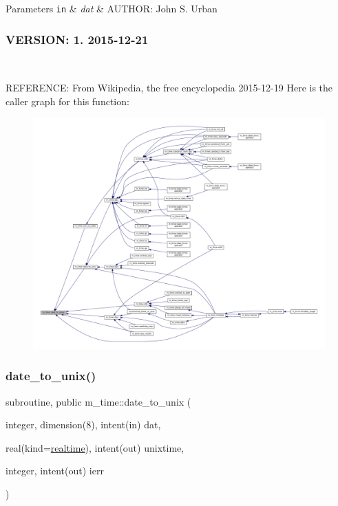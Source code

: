 \begin{DoxyParams}[1]{Parameters}
\mbox{\tt in}  & {\em dat} & A\+U\+T\+H\+OR\+: John S. Urban \subsubsection*{V\+E\+R\+S\+I\+ON\+: 1. 2015-\/12-\/21}\\
\hline
\end{DoxyParams}
R\+E\+F\+E\+R\+E\+N\+CE\+: From Wikipedia, the free encyclopedia 2015-\/12-\/19 Here is the caller graph for this function\+:\nopagebreak
\begin{figure}[H]
\begin{center}
\leavevmode
\includegraphics[width=350pt]{namespacem__time_acfdc970b4154b0c15bd33727636e3992_icgraph}
\end{center}
\end{figure}
\mbox{\label{namespacem__time_aed245c691853279ebf0ce899dec9caa9}} 
\subsubsection{\texorpdfstring{date\+\_\+to\+\_\+unix()}{date\_to\_unix()}}
{\footnotesize\ttfamily subroutine, public m\+\_\+time\+::date\+\_\+to\+\_\+unix (\begin{DoxyParamCaption}\item[{integer, dimension(8), intent(in)}]{dat,  }\item[{real(kind=\mbox{\hyperlink{namespacem__time_ac10ea9e8d59ec74eaa7d89f2517d7422}{realtime}}), intent(out)}]{unixtime,  }\item[{integer, intent(out)}]{ierr }\end{DoxyParamCaption})}



